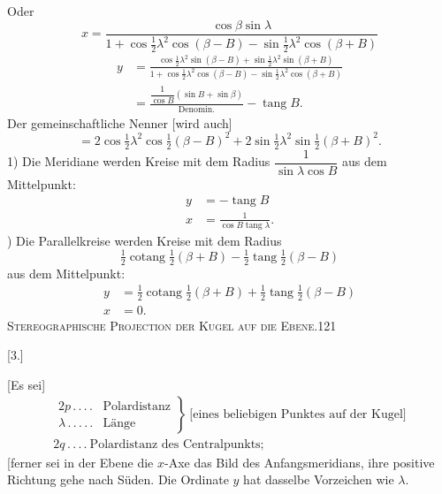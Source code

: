 Oder
\[
x=\frac{\cos\beta\sin\lambda}{1+\cos\frac12\lambda^2\cos(\beta-B)-\sin\frac12\lambda^2\cos(\beta+B)}
\]
\[
\begin{aligned}
y&=\frac{\cos\frac12\lambda^2\sin(\beta-B)+\sin\frac12\lambda^2\sin(\beta+B)}{1+\cos\frac12\lambda^2\cos(\beta-B)-\sin\frac12\lambda^2\cos(\beta+B)}\\[6pt]
&=\frac{\dfrac1{\cos B}(\sin B+\sin\beta)}{\mathrm{Denomin.}}-\operatorname{tang}B.
\end{aligned}
\]
Der gemeinschaftliche Nenner [wird auch]
\[
=2\cos\tfrac12\lambda^2\cos\tfrac12(\beta-B)^2+2\sin\tfrac12\lambda^2\sin\tfrac12(\beta+B)^2.
\]
1) Die Meridiane werden Kreise mit dem Radius $\dfrac1{\sin\lambda\cos B}$ aus dem Mittelpunkt:
\[
\begin{aligned}
y&=-\operatorname{tang}B\\
x&=\frac1{\cos B\operatorname{tang}\lambda}.
\end{aligned}
\]
) Die Parallelkreise werden Kreise mit dem Radius
\[
\tfrac12\operatorname{cotang}\tfrac12(\beta+B)-\tfrac12\operatorname{tang}\tfrac12(\beta-B)
\]
aus dem Mittelpunkt:
\[
\begin{aligned}
y&=\tfrac12\operatorname{cotang}\tfrac12(\beta+B)+\tfrac12\operatorname{tang}\tfrac12(\beta-B)\\
x&=0.
\end{aligned}
\]
\clearpage
\noindent\mbox{}\hfill{\small\textsc{Stereographische Projection der Kugel auf die Ebene.}}\hfill121\par\bigskip
\begin{center}[3.]\end{center}
[Es sei]
\[
\begin{gathered}
\left.\begin{array}{ll}
2p\, .\, .\, .\, .&\text{Polardistanz}\\
\lambda\, .\, .\, .\, .\, .&\text{Länge}
\end{array}\right\}\ \text{[eines beliebigen Punktes auf der Kugel]}\\[5pt]
2q\, .\, .\, .\, .\ \text{Polardistanz des Centralpunkts;}
\end{gathered}
\]
[ferner sei in der Ebene die $x$-Axe das Bild des Anfangsmeridians, ihre positive Richtung gehe nach Süden. Die Ordinate $y$ hat dasselbe Vorzeichen wie $\lambda$.

